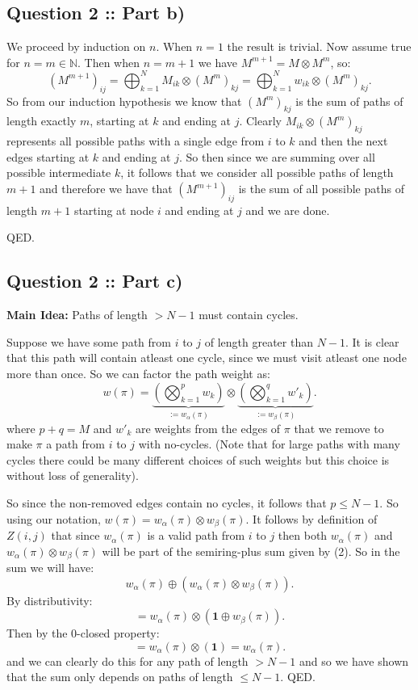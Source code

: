 \documentclass[a4paper]{article}
\begin{document}
\subsection*{Question 2 :: Part b)}
We proceed by induction on $n$.
When $n=1$ the result is trivial. Now assume true for $n = m \in \mathbb{N}$.
Then when $n = m+1$ we have $M^{m+1} = M \otimes M^m$, so:
\[
    (M^{m+1})_{ij} = \bigoplus_{k=1}^N M_{ik} \otimes (M^m)_{kj} = \bigoplus_{k=1}^N w_{ik} \otimes (M^m)_{kj}
.\]
So from our induction hypothesis we know that $(M^m)_{kj}$ is the sum of paths of length exactly $m$,
starting at $k$ and ending at $j$. Clearly $M_{ik} \otimes (M^m)_{kj}$ represents all possible
paths with a single edge from $i$ to $k$ and then the next edges starting at $k$ and ending at $j$.
So then since we are summing over all possible intermediate $k$, it follows that we consider all possible
paths of length $m+1$ and therefore we have that $(M^{m+1})_{ij}$ is the sum of all possible
paths of length $m+1$ starting at node $i$ and ending at $j$ and we are done.

QED.

\subsection*{Question 2 :: Part c)}
\textbf{Main Idea:} Paths of length $>N-1$ must contain cycles.

Suppose we have some path from $i$ to $j$ of length greater than $N-1$.
It is clear that this path will contain atleast one cycle, since we must visit atleast one node  more than once.
So we can factor the path weight as:
\[
w(\pi) = \underbrace{\left( \bigotimes_{k=1}^p w_{k} \right) }_{:= w_{\alpha}(\pi)}\otimes \underbrace{\left( \bigotimes_{k=1}^q w'_k \right) }_{:= w_{\beta}(\pi)}
.\]
where $p+q = M$ and  $w'_k$ are weights from the edges of $\pi$ that we remove to
make $\pi$ a path from $i$ to $j$ with no-cycles. (Note that for large paths with many cycles there could be many different choices of such weights but this choice
is without loss of generality).

So since the non-removed edges contain no cycles, it follows that $p \le  N-1$.
So using our notation, $w(\pi) = w_{\alpha}(\pi) \otimes w_{\beta}(\pi)$.
It follows by definition of $Z(i, j)$ that since $w_{\alpha}(\pi)$ is a valid path
from $i$ to $j$ then both $w_{\alpha}(\pi)$ and $w_{\alpha}(\pi) \otimes w_{\beta}(\pi)$
will be part of the semiring-plus sum given by (2).
So in the sum we will have:
\[
w_{\alpha}(\pi) \oplus (w_{\alpha}(\pi) \otimes w_{\beta}(\pi))
.\]
By distributivity:
\[
= w_{\alpha}(\pi) \otimes (\bm{1} \oplus w_{\beta}(\pi))
.\]
Then by the 0-closed property:
\[
= w_{\alpha}(\pi) \otimes (\bm{1}) = w_{\alpha}(\pi)
.\]
and we can clearly do this for any path of length $> N-1$
and so we have shown that the sum only depends on paths of length  $\le  N-1$.
QED.
\end{document}
